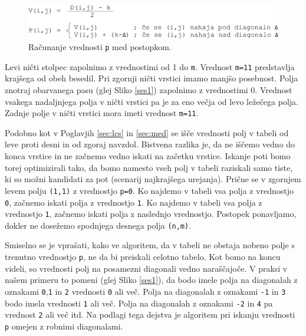 \documentclass[a4paper, 12pt, twoside]{book}
\begin{document}
\begin{figure}[placement h]
\begin{center}
\includegraphics[width=13cm]{img/ses2.pdf}
\end{center}
\caption{Računanje vrednosti {\tt p} med postopkom.}
\label{ses2}
\end{figure}

Levi ničti stolpec zapolnimo z vrednostimi od 1 do {\tt m}. Vrednost {\tt m=11} predstavlja krajšega od obeh besedil. Pri zgornji ničti vrstici imamo manjšo posebnost. Polja znotraj obarvanega pasu (glej Sliko \ref{ses1}) zapolnimo z vrednostimi 0. Vrednost vsakega nadaljnjega polja v ničti vrstici pa je za eno večja od levo ležečega polja. Zadnje polje v ničti vrstici mora imeti vrednost {\tt m=11}.

Podobno kot v Poglavjih \ref{sec:lcs} in \ref{sec:med} se išče vrednosti polj v tabeli od leve proti desni in od zgoraj navzdol. Bistvena razlika je, da ne iščemo vedno do konca vrstice in ne začnemo vedno iskati na začetku vrstice. Iskanje poti bomo torej optimizirali tako, da bomo namesto vseh polj v tabeli raziskali samo tiste, ki so možni kandidati za pot (scenarij najkrajšega urejanja). Prične se v zgornjem levem polju {\tt (1,1)} z vrednostjo {\tt p=0}. Ko najdemo v tabeli vsa polja z vrednostjo {\tt 0}, začnemo iskati polja z vrednostjo {\tt 1}. Ko najdemo v tabeli vsa polja z vrednostjo {\tt 1}, začnemo iskati polja z naslednjo vrednostjo. Postopek ponavljamo, dokler ne dosežemo spodnjega desnega polja {\tt (n,m)}.

Smiselno se je vprašati, kako ve algoritem, da v tabeli ne obstaja nobeno polje s trenutno vrednostjo {\tt p}, ne da bi preiskali celotno tabelo. Kot bomo na koncu videli, so vrednosti polj na posamezni diagonali vedno naraščajoče. V praksi v našem primeru to pomeni (glej Sliko \ref{ses1}), da bodo imele polja na diagonalah z oznakami {\tt 0},{\tt 1} in {\tt 2} vrednosti {\tt 0} ali več. Polja na diagonalah z oznakami {\tt -1} in {\tt 3} bodo imela vrednosti {\tt 1} ali več. Polja na diagonalah z oznakami {\tt -2} in {\tt 4} pa vrednost {\tt 2} ali več itd. Na podlagi tega dejstva je algoritem pri iskanju vrednosti {\tt p} omejen z robnimi diagonalami.

\pagebreak
\end{document}
